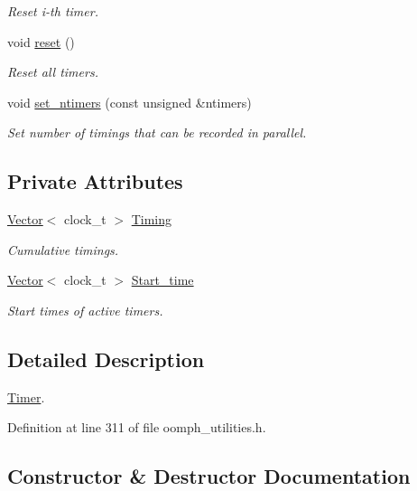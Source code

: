 \begin{DoxyCompactItemize}
\begin{DoxyCompactList}\small\item\em Reset i-\/th timer. \end{DoxyCompactList}\item 
void \hyperlink{classoomph_1_1Timer_aed19397ab3c3d4449cbc3119b854fbda}{reset} ()
\begin{DoxyCompactList}\small\item\em Reset all timers. \end{DoxyCompactList}\item 
void \hyperlink{classoomph_1_1Timer_a8233e0edd4c33fece829f33aff6c8e5c}{set\+\_\+ntimers} (const unsigned \&ntimers)
\begin{DoxyCompactList}\small\item\em Set number of timings that can be recorded in parallel. \end{DoxyCompactList}\end{DoxyCompactItemize}
\subsection*{Private Attributes}
\begin{DoxyCompactItemize}
\item 
\hyperlink{classoomph_1_1Vector}{Vector}$<$ clock\+\_\+t $>$ \hyperlink{classoomph_1_1Timer_a66035221f55db1dc65b8fb89ed0c831d}{Timing}
\begin{DoxyCompactList}\small\item\em Cumulative timings. \end{DoxyCompactList}\item 
\hyperlink{classoomph_1_1Vector}{Vector}$<$ clock\+\_\+t $>$ \hyperlink{classoomph_1_1Timer_ab3e1287373e9c5ae81731dd57c5db66f}{Start\+\_\+time}
\begin{DoxyCompactList}\small\item\em Start times of active timers. \end{DoxyCompactList}\end{DoxyCompactItemize}


\subsection{Detailed Description}
\hyperlink{classoomph_1_1Timer}{Timer}. 

Definition at line 311 of file oomph\+\_\+utilities.\+h.



\subsection{Constructor \& Destructor Documentation}
\mbox{\label{classoomph_1_1Timer_a8abb0baeaa25a08ac1b31c1147aac92e}} 
